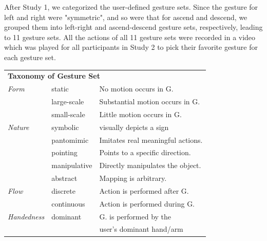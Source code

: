 \documentclass{sigchi}
\newcommand\tabhead[1]{\small\textbf{#1}}
\begin{document}
After Study 1, we categorized the user-defined gesture sets. Since the gesture for left and right were "symmetric", and so were that for ascend and descend, we grouped them into left-right and ascend-descend gesture sets, respectively, leading to 11 gesture sets. All the actions of all 11 gesture sets were recorded in a video which was played for all participants in Study 2 to pick their favorite gesture for each gesture set.

\begin{table}
  \centering
  \begin{adjustwidth}{-0.4cm}{}
  \begin{tabular}{|l|l|l|}
    \hline
    \multicolumn{3}{|p{1.06\columnwidth}|}{\centering\tabhead{\textbf{Taxonomy of Gesture Set}}}\\
    \Xhline{4\arrayrulewidth}
    \em{Form} &static& No motion occurs in G.\\ \cline{2-3}
    &large-scale& Substantial motion occurs in G. \\ \cline{2-3}
    &small-scale& Little motion occurs in G.\\
    \Xhline{4\arrayrulewidth}
    \em{Nature} & symbolic &visually depicts a sign \\ \cline{2-3}
    &pantomimic&Imitates real meaningful actions.\\ \cline{2-3}
    &pointing&Points to a specific direction.\\ \cline{2-3}
    &manipulative&Directly manipulates the object.\\ \cline{2-3}
    &abstract&Mapping is arbitrary.\\
    \Xhline{4\arrayrulewidth}
    \em{Flow} & discrete&Action is performed after G.\\ \cline{2-3}
    &continuous&Action is performed during G.\\ 
    \Xhline{4\arrayrulewidth}
    \em{Handedness} & dominant & G. is performed by the \\&&user's dominant hand/arm \\ \cline{2-3}

\end{tabular}
\end{adjustwidth}
\end{table}
\end{document}
